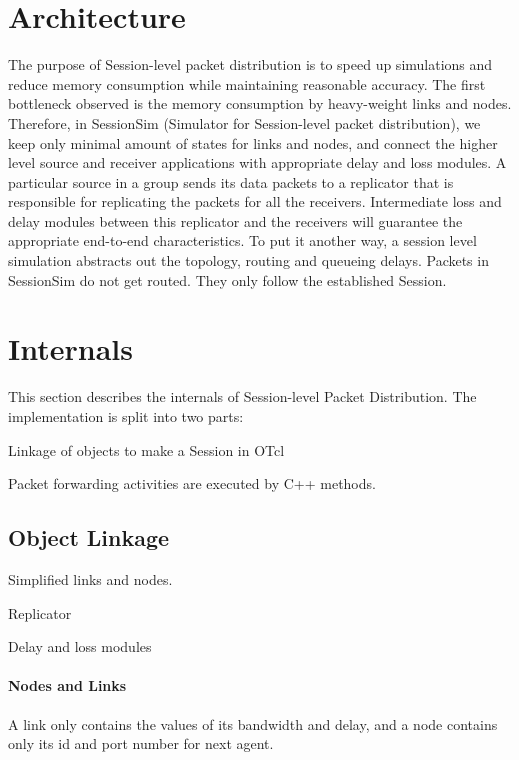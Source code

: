\section{Architecture}
\label{sec:session-arch}
The purpose of Session-level packet distribution is to
speed up simulations and reduce memory consumption while 
maintaining reasonable accuracy.
The first bottleneck observed is the memory consumption by heavy-weight
links and nodes.  Therefore, in SessionSim (Simulator for Session-level
packet distribution), we keep only minimal amount of 
states for links and nodes, and connect the higher level source and 
receiver applications with appropriate delay and loss modules.
A particular source in a group sends its data packets
to a replicator that is responsible for replicating the packets
for all the receivers.
Intermediate loss and delay modules between this replicator and the receivers
will guarantee the appropriate end-to-end characteristics.
To put it another way, a session level simulation
abstracts out the topology, routing and queueing delays.
Packets in SessionSim do not get routed.  
They only follow the established Session.

\section{Internals}
This section describes the internals of Session-level Packet Distribution.
The implementation is split into two parts:
\begin{list}{}{}
\item  Linkage of objects to make a Session in OTcl 
\item  Packet forwarding activities are executed by C++ methods.  
\end{list}

\subsection{Object Linkage}
\label{sec:session-objlink}

\begin{list}{}{}
\item  Simplified links and nodes.
\item  Replicator
\item  Delay and loss modules
\end{list}

\paragraph{Nodes and Links}
A link only contains the values of
its bandwidth and delay, and a node contains only its id and port number
for next agent.

